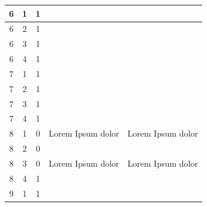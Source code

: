\begin{landscape}
\begin{longtable}{|c|c|c|l|l|}
        6               & 1                      & 1               &                                                       &                                           \\ \hline
        6               & 2                      & 1               &                                                       &                                           \\ \hline
        6               & 3                      & 1               &                                                       &                                           \\ \hline
        6               & 4                      & 1               &                                                       &                                           \\ \hline
        7               & 1                      & 1               &                                                       &                                           \\ \hline
        7               & 2                      & 1               &                                                       &                                           \\ \hline
        7               & 3                      & 1               &                                                       &                                           \\ \hline
        7               & 4                      & 1               &                                                       &                                           \\ \hline
        8               & 1                      & 0               & Lorem Ipsum dolor     & Lorem Ipsum dolor                \\ \hline
        8               & 2                      & 0               &                                                       &                                           \\ \hline
        8               & 3                      & 0               & Lorem Ipsum dolor                  & Lorem Ipsum dolor                        \\ \hline
        8               & 4                      & 1               &                                                       &                                           \\ \hline
        9               & 1                      & 1               &                                                       &                                           \\ \hline

\end{longtable}
\end{landscape}
